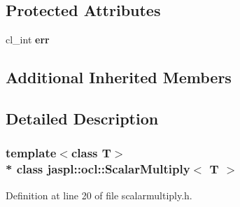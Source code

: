 \subsection*{Protected Attributes}
\begin{DoxyCompactItemize}
\item 
cl\+\_\+int {\bfseries err}\hypertarget{classjaspl_1_1ocl_1_1_scalar_multiply_a8e0f71ad2f0de06645b1f14e6ce9ec62}{}\label{classjaspl_1_1ocl_1_1_scalar_multiply_a8e0f71ad2f0de06645b1f14e6ce9ec62}

\end{DoxyCompactItemize}
\subsection*{Additional Inherited Members}


\subsection{Detailed Description}
\subsubsection*{template$<$class T$>$\\*
class jaspl\+::ocl\+::\+Scalar\+Multiply$<$ T $>$}



Definition at line 20 of file scalarmultiply.\+h.

